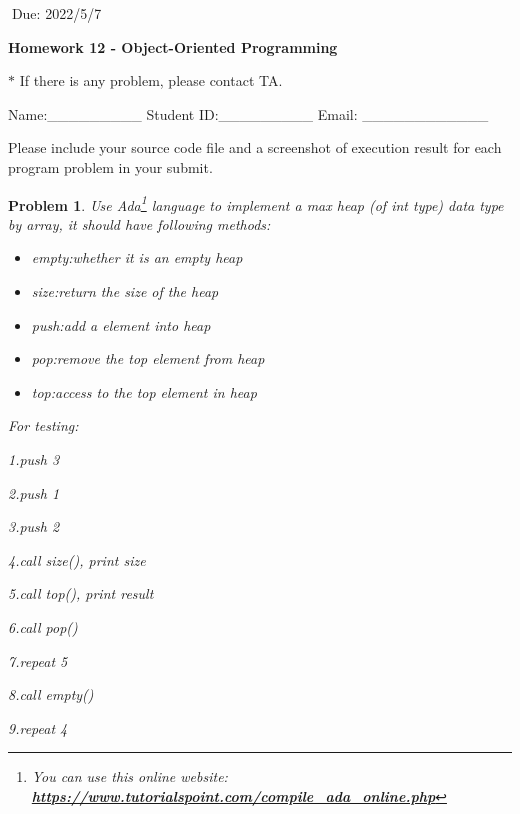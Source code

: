 \documentclass[12pt]{article}
\newtheorem{hw}{Problem}
\begin{document}
$\;$\hfill Due: 2022/5/7

\begin{center}
{\LARGE\bf Homework 12 - Object-Oriented Programming}
\end{center}

\begin{center}
	\footnotesize{\color{red}$*$ If there is any problem, please contact TA.}
	
	\footnotesize{\color{blue} \quad Name:\_\_\_\_\_\_\_\_\_  \quad Student ID:\_\_\_\_\_\_\_\_\_ \quad Email: \_\_\_\_\_\_\_\_\_\_\_\_}
\end{center}

Please include your source code file and a screenshot of execution result for each program problem in your submit.

\begin{hw}\rm
	Use Ada\footnote{You can use this online website: \href{https://www.tutorialspoint.com/compile_ada_online.php}{\textbf{https://www.tutorialspoint.com/compile\_ada\_online.php}}} language to implement a max heap (of int type) data type by array, it should have following methods:
	\begin{itemize}
		\item empty:whether it is an empty heap
		\item size:return the size of the heap
		\item push:add a element into heap
		\item pop:remove the top element from heap
		\item top:access to the top element in heap
	\end{itemize}
	For testing: 
	
	1.push 3
	
	2.push 1
	
	3.push 2
	
	4.call size(), print size
	
	5.call top(), print result
	
	6.call pop()
	
	7.repeat 5

	8.call empty()
	
	9.repeat 4
	
\end{hw}
\end{document}
